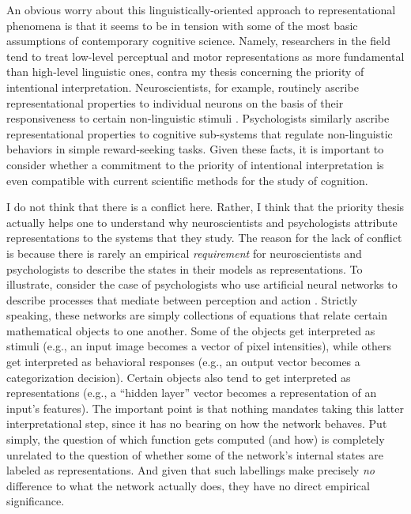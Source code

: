 An obvious worry about this linguistically-oriented approach to representational phenomena is that it seems to be in tension with some of the most basic assumptions of contemporary cognitive science. Namely, researchers in the field tend to treat low-level perceptual and motor representations as more fundamental than high-level linguistic ones, contra my thesis concerning the priority of intentional interpretation. Neuroscientists, for example, routinely ascribe representational properties to individual neurons on the basis of their responsiveness to certain non-linguistic stimuli \citep{Eliasmith:2000,EliasmithAnderson:2003,Eliasmith:2013}. Psychologists similarly ascribe representational properties to cognitive sub-systems that regulate non-linguistic behaviors in simple reward-seeking tasks. Given these facts, it is important to consider whether a commitment to the priority of intentional interpretation is even compatible with current scientific methods for the study of cognition. 

I do not think that there is a conflict here. Rather, I think that the priority thesis actually helps one to understand why neuroscientists and psychologists attribute representations to the systems that they study. The reason for the lack of conflict is because there is rarely an empirical \textit{requirement} for neuroscientists and psychologists to describe the states in their models as representations. To illustrate, consider the case of psychologists who use artificial neural networks to describe processes that mediate between perception and action \citep[e.g.,][]{SmolenskyLegendre:2006,McClelland:2010,Elman:1990,Elman:1991}. Strictly speaking, these networks are simply collections of equations that relate certain mathematical objects to one another. Some of the objects get interpreted as stimuli (e.g., an input image becomes a vector of pixel intensities), while others get interpreted as behavioral responses (e.g., an output vector becomes a categorization decision). Certain objects also tend to get interpreted as representations (e.g., a ``hidden layer'' vector becomes a representation of an input's features). The important point is that nothing mandates taking this latter interpretational step, since it has no bearing on how the network behaves. Put simply, the question of which function gets computed (and how) is completely unrelated to the question of whether some of the network's internal states are labeled as representations. And given that such labellings make precisely \textit{no} difference to what the network actually does, they have no direct empirical significance. 

